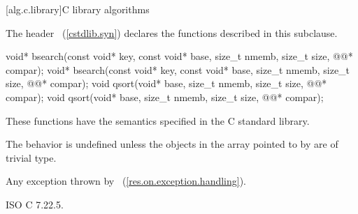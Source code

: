 [alg.c.library]{C library algorithms}

\pnum
{}%
\begin{note}
The header ~(\ref{cstdlib.syn})
declares the functions described in this subclause.
\end{note}

%
%
\begin{itemdecl}
void* bsearch(const void* key, const void* base, size_t nmemb, size_t size,
              @@* compar);
void* bsearch(const void* key, const void* base, size_t nmemb, size_t size,
              @@* compar);
void qsort(void* base, size_t nmemb, size_t size, @@* compar);
void qsort(void* base, size_t nmemb, size_t size, @@* compar);
\end{itemdecl}

\begin{itemdescr}
\pnum
\effects
These functions have the semantics specified in the C standard library.

\pnum
\remarks
The behavior is undefined
unless the objects in the array pointed to by 
are of trivial type.

\pnum
\throws
Any exception thrown by ~(\ref{res.on.exception.handling}).
\end{itemdescr}

\xref
ISO C 7.22.5.
